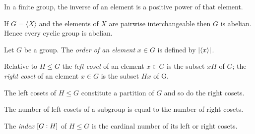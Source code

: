 \vspace{2mm}


\vspace{2mm}

\begin{proposition}
	In a finite group, the inverse of an element is a positive power of that element.
\end{proposition}



\vspace{2mm}


\vspace{2mm}

\begin{proposition}
	If $G = \langle X \rangle$ and the elements of $X$ are pairwise interchangeable then $G$ is abelian. Hence every cyclic group is abelian.
\end{proposition}

\vspace{2mm}

\begin{definition}
	Let $G$ be a group. The \emph{order of an element} $x \in G$ is defined by $\abs[0]{\langle x \rangle}$.
\end{definition}

\vspace{2mm}

\begin{definition}
	Relative to $H \leq G$ the \emph{left coset} of an element $x \in G$ is the subset $xH$ of $G$; the \emph{right coset} of an element $x \in G$ is the subset $Hx$ of G.
\end{definition}

\vspace{2mm}

\begin{proposition}
	The left cosets of $H \leq G$ constitute a partition of $G$ and so do the right cosets.	
\end{proposition}

\vspace{2mm}

\begin{proposition}
	The number of left cosets of a subgroup is equal to the number of right cosets.
\end{proposition}

\vspace{2mm}

\begin{definition}
	The \emph{index} $\intcc{G:H}$ of $H \leq G$ is the cardinal number of its left or right cosets.
\end{definition}

